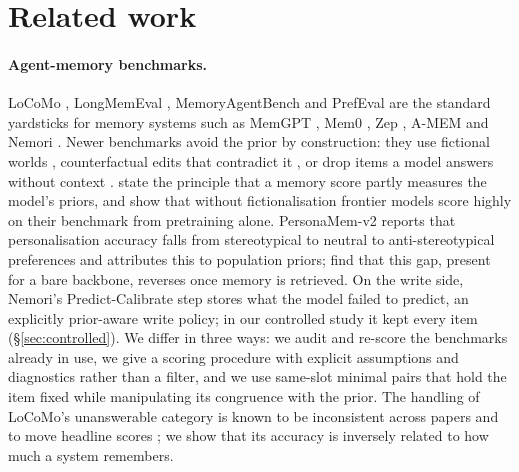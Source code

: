 \section{Related work}
\label{sec:related}

\paragraph{Agent-memory benchmarks.} LoCoMo \citep{maharana2024locomo}, LongMemEval \citep{wu2025longmemeval},
MemoryAgentBench \citep{hu2025memoryagentbench} and PrefEval \citep{zhao2025prefeval} are the standard yardsticks for
memory systems such as MemGPT \citep{packer2023memgpt}, Mem0 \citep{chhikara2025mem0}, Zep \citep{rasmussen2025zep},
A-MEM \citep{xu2025amem} and Nemori \citep{nemori2025}. Newer benchmarks avoid the prior by construction: they use
fictional worlds \citep{groundtruthfirst2026,memgym2026}, counterfactual edits that contradict it
\citep{hu2025memoryagentbench}, or drop items a model answers without context
\citep{longmemevalvtwo2026,recon2026}. \citet{groundtruthfirst2026} state the principle that a memory score partly
measures the model's priors, and \citet{memgym2026} show that without fictionalisation frontier models score highly on their benchmark from
pretraining alone. PersonaMem-v2 \citep{personamemv2} reports that personalisation accuracy falls from stereotypical to
neutral to anti-stereotypical preferences and attributes this to population priors; \citet{feng2026knowit} find that
this gap, present for a bare backbone, reverses once memory is retrieved. On the write side, Nemori's Predict-Calibrate
step stores what the model failed to predict, an explicitly prior-aware write policy; in our controlled study it kept
every item (\S\ref{sec:controlled}). We differ in three ways: we audit and re-score the benchmarks already in use, we give a
scoring procedure with explicit assumptions and diagnostics rather than a filter, and we use same-slot minimal pairs that
hold the item fixed while manipulating its congruence with the prior. The handling of LoCoMo's unanswerable category is
known to be inconsistent across papers and to move headline scores \citep{acm2026}; we show that its
accuracy is inversely related to how much a system remembers.


